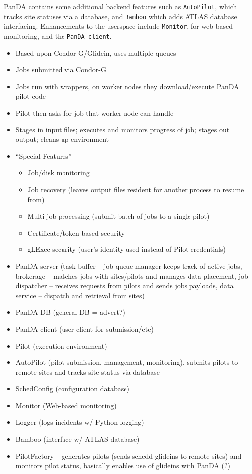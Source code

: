 \documentclass{sig-alternate}
\begin{document}
PanDA contains some additional backend features such as \texttt{AutoPilot}, which
tracks site statuses via a database, and \texttt{Bamboo} which adds
ATLAS database interfacing.  Enhancements to the userspace include 
\texttt{Monitor}, for web-based monitoring, and the \texttt{PanDA client}.


\begin{itemize}
\item Based upon Condor-G/Glidein, uses multiple queues
\item Jobs submitted via Condor-G
\item Jobs run with wrappers, on worker nodes they download/execute PanDA pilot code
\item Pilot then asks for job that worker node can handle
\item Stages in input files; executes and monitors progress of job; stages out output;
  cleans up environment
\item ``Special Features''
  \begin{itemize}
  \item Job/disk monitoring
  \item Job recovery (leaves output files resident for another 
    process to resume from)
  \item Multi-job processing (submit batch of jobs to a single pilot)
  \item Certificate/token-based security
  \item gLExec security (user's identity used instead of Pilot credentials)
  \end{itemize}

\item PanDA server (task buffer -- job queue manager keeps track of
  active jobs, brokerage -- matches jobs  with sites/pilots and manages
  data placement, job dispatcher -- receives requests from pilots and sends
  jobs payloads, data service -- dispatch and retrieval from sites)
\item PanDA DB (general DB = advert?)
\item PanDA client (user client for submission/etc)
\item Pilot (execution environment)
\item AutoPilot (pilot submission, management, monitoring), submits
  pilots to remote sites and tracks site status via database
\item SchedConfig (configuration database)
\item Monitor (Web-based monitoring)
\item Logger (logs incidents w/ Python logging)
\item Bamboo (interface w/ ATLAS database)
\item PilotFactory -- generates pilots (sends schedd glideins to remote sites)
  and monitors pilot status, basically enables use of glideins with PanDA (?)
\end{itemize}
\end{document}
